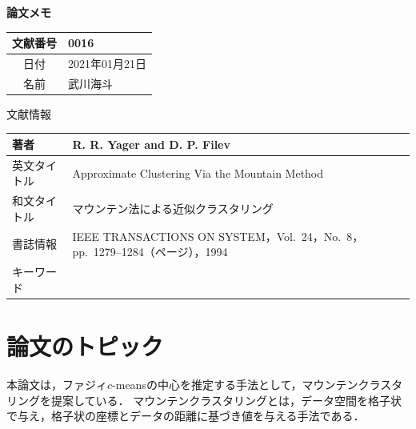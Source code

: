 \documentclass[10pt,onecolumn]{jsarticle}
\begin{document}
\vspace{-20mm}
\begin{center}
{\LARGE\textbf{論文メモ}}
\end{center}

\begin{flushright}
\begin{tabular}{|c|l|}
\hline
文献番号  &  0016
\\
\hline
日付  &  2021年01月21日
\\
\hline
名前  &  武川海斗
\\
\hline
\end{tabular}
\end{flushright}


%
%
\begin{center}
{\large 文献情報}
\begin{table}[hbp]%
\begin{tabular}{|l||l|}
\hline
著者  &  R. R. Yager and D. P. Filev
\\ \hline
英文タイトル  & Approximate Clustering Via the Mountain Method
\\ \hline
和文タイトル  & マウンテン法による近似クラスタリング
\\ \hline
書誌情報  &  IEEE TRANSACTIONS ON SYSTEM，Vol.~24，No.~8，pp.~1279--1284（ページ），1994
\\ \hline
キーワード &
\\ \hline
\end{tabular}
\end{table}
\end{center}

\section{論文のトピック}
本論文は，ファジィ$c$-meansの中心を推定する手法として，マウンテンクラスタリングを提案している．
マウンテンクラスタリングとは，データ空間を格子状で与え，格子状の座標とデータの距離に基づき値を与える手法である．
\end{document}
